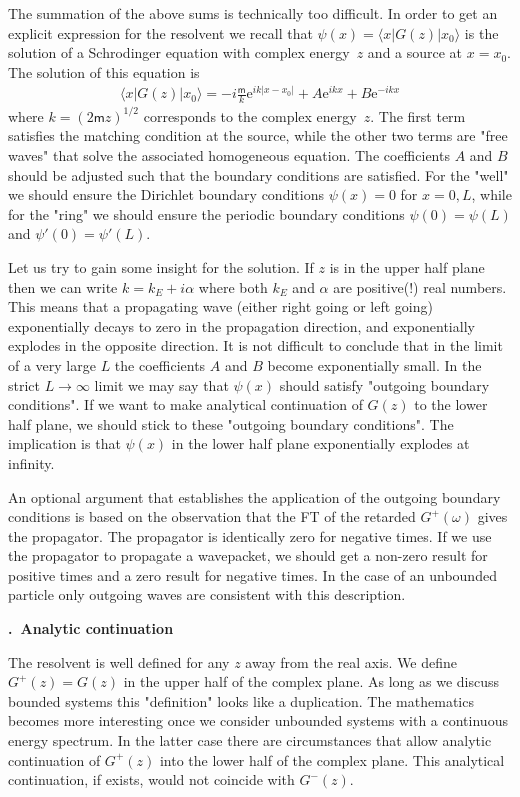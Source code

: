 \documentclass[onecolumn,fleqn, 11pt]{revtex4}
\newcommand{\eexp}{\mathrm{e}^}
\newcommand{\mass}{\mathsf{m}}
\newcommand{\beq}{\begin{eqnarray}}
\newcommand{\eeq}{\end{eqnarray}}
\renewcommand{\thesubsection}{\arabic{subsection}}
\renewcommand{\thesubsubsection}{\arabic{subsubsection}}
\newcommand{\sheadC}[1]
{
\addtocounter{subsubsection}{1}
\vspace{5mm}
{\bf \thesubsection.\thesubsubsection \ #1}  
\nopagebreak
\phantomsection
}
\begin{document}
The summation of the above sums 
is technically too difficult.  
In order to get an explicit 
expression for the resolvent 
we recall that ${\psi(x)=\langle x|G(z)|x_0 \rangle}$ 
is the solution of a Schrodinger 
equation with complex energy~$z$ 
and a source at ${x=x_0}$. 
The solution of this equation is 
\beq
\langle x|G(z)|x_0\rangle = -i\frac{\mass}{k}\eexp{ik|x-x_0|} + A \eexp{ikx} + B \eexp{-ikx} 
\eeq
where $k=(2\mass z)^{1/2}$ corresponds to the complex 
energy~$z$. The first term satisfies the matching 
condition at the source, while 
the other two terms are "free waves" 
that solve the associated homogeneous equation. 
The coefficients $A$ and $B$ should be adjusted 
such that the boundary conditions are satisfied. 
For the "well" we should ensure 
the Dirichlet boundary conditions $\psi(x)=0$ for $x=0,L$,  
while for the "ring" we should ensure 
the periodic boundary conditions $\psi(0)=\psi(L)$ 
and $\psi'(0)=\psi'(L)$.
 

Let us try to gain some insight for the solution.
If $z$ is in the upper half plane then we can write 
$k = k_E + i\alpha$ where both $k_E$ and $\alpha$ are 
positive(!) real numbers.  
This means that a propagating wave (either right going 
or left going)  exponentially decays to zero 
in the propagation direction, 
and exponentially explodes in the opposite direction. 
It is not difficult to conclude that in the limit 
of a very large $L$ the coefficients $A$ and $B$ 
become exponentially small. In the strict 
$L\rightarrow \infty$ limit we may say that $\psi(x)$ 
should satisfy "outgoing boundary conditions".  
If we want to make analytical continuation of $G(z)$ 
to the lower half plane, we should stick to these  
"outgoing boundary conditions". The implication is that 
$\psi(x)$ in the lower half plane exponentially 
explodes at infinity.

An optional argument that establishes the application 
of the outgoing boundary conditions is based 
on the observation that the FT of the retarded $G^{+}(\omega)$
gives the propagator. The propagator is identically 
zero for negative times. If we use the propagator 
to propagate a wavepacket, we should get a non-zero result 
for positive times and a zero result for negative times. 
In the case of an unbounded particle only outgoing waves are 
consistent with this description.  




\sheadC{Analytic continuation}


The resolvent is well defined for any $z$ away 
from the real axis. We define $G^{+}(z) = G(z)$  
in the upper half of the complex plane. 
As long as we discuss bounded systems this "definition" 
looks like a duplication. The mathematics becomes 
more interesting once we consider unbounded systems 
with a continuous energy spectrum.
In the latter case there are circumstances that allow 
analytic continuation of $G^{+}(z)$ into the lower half 
of the complex plane.
This analytical continuation, if exists, would not  
coincide with $G^{-}(z)$. 
\end{document}
